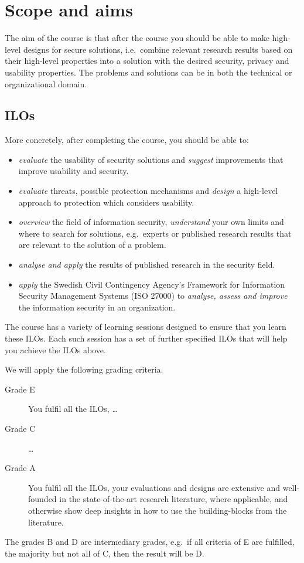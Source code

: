 \section{Scope and aims}%
\label{sec:aim}
The aim of the course is that after the course you should be able to make 
high-level designs for secure solutions, i.e.\ combine relevant research results 
based on their high-level properties into a solution with the desired security, 
privacy and usability properties.
The problems and solutions can be in both the technical or organizational 
domain.

\subsection{\Aclp*{ILO}}

More concretely, after completing the course, you should be able to:
\begin{itemize}
  \item \emph{evaluate} the usability of security solutions and \emph{suggest} 
    improvements that improve usability and security.
  \item \emph{evaluate} threats, possible protection mechanisms and 
    \emph{design} a high-level approach to protection which considers 
    usability.
  \item \emph{overview} the field of information security, \emph{understand} 
    your own limits and where to search for solutions, e.g.\ experts or 
    published research results that are relevant to the solution of a problem.
  \item \emph{analyse and apply} the results of published research in the 
    security field.
  \item \emph{apply} the Swedish Civil Contingency Agency's Framework for 
    Information Security Management Systems (ISO 27000) to \emph{analyse, assess 
      and improve} the information security in an organization.
\end{itemize}
The course has a variety of learning sessions designed to ensure that you learn 
these \acp{ILO}.
Each such session has a set of further specified \acp{ILO} that will help you 
achieve the \acp{ILO} above.

We will apply the following grading criteria.
\begin{description}
  \item[Grade E] You fulfil all the \acp{ILO}, \dots
  \item[Grade C] \dots
  \item[Grade A] You fulfil all the \acp{ILO},
    your evaluations and designs are extensive and well-founded in the 
    state-of-the-art research literature, where applicable, and otherwise show 
    deep insights in how to use the building-blocks from the literature.
\end{description}
The grades B and D are intermediary grades, e.g.\ if all criteria of E are 
fulfilled, the majority but not all of C, then the result will be D.

